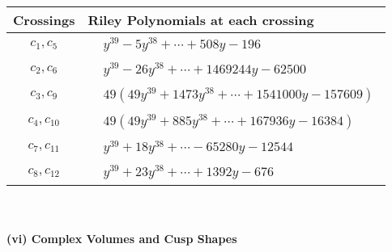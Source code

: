 \documentclass[1p]{elsarticle_modified}
\theoremstyle{definition}
\begin{document}
\begin{tabular}{m{50pt}|m{274pt}}
Crossings & \hspace{64pt}Riley Polynomials at each crossing \\
\hline $$\begin{aligned}c_{1},c_{5}\end{aligned}$$&$\begin{aligned}
&y^{39}-5 y^{38}+\cdots+508 y-196
\end{aligned}$\\
\hline $$\begin{aligned}c_{2},c_{6}\end{aligned}$$&$\begin{aligned}
&y^{39}-26 y^{38}+\cdots+1469244 y-62500
\end{aligned}$\\
\hline $$\begin{aligned}c_{3},c_{9}\end{aligned}$$&$\begin{aligned}
&49(49 y^{39}+1473 y^{38}+\cdots+1541000 y-157609)
\end{aligned}$\\
\hline $$\begin{aligned}c_{4},c_{10}\end{aligned}$$&$\begin{aligned}
&49(49 y^{39}+885 y^{38}+\cdots+167936 y-16384)
\end{aligned}$\\
\hline $$\begin{aligned}c_{7},c_{11}\end{aligned}$$&$\begin{aligned}
&y^{39}+18 y^{38}+\cdots-65280 y-12544
\end{aligned}$\\
\hline $$\begin{aligned}c_{8},c_{12}\end{aligned}$$&$\begin{aligned}
&y^{39}+23 y^{38}+\cdots+1392 y-676
\end{aligned}$\\
\hline
\end{tabular}\\~\\
\newpage\flushleft \textbf{(vi) Complex Volumes and Cusp Shapes}
\end{document}
